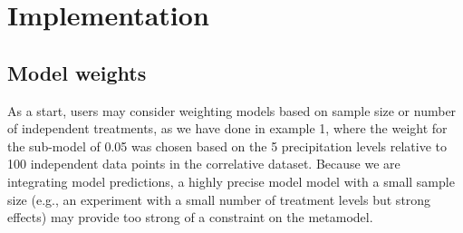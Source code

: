 \documentclass[11pt]{article}
\newcommand{\rev}[1]{{\color{RoyalBlue}#1}}
\begin{document}
\section*{Implementation}
\subsection*{Model weights}
\rev{As a start, users may consider weighting models based on sample size or number of independent treatments, as we have done in example 1, where the weight for the sub-model of 0.05 was chosen based on the 5 precipitation levels relative to 100 independent data points in the correlative dataset.
Because we are integrating model predictions, a highly precise model model with a small sample size (e.g., an experiment with a small number of treatment levels but strong effects) may provide too strong of a constraint on the metamodel.}

\renewcommand\refname{Literature Cited}
{}

\end{document}
